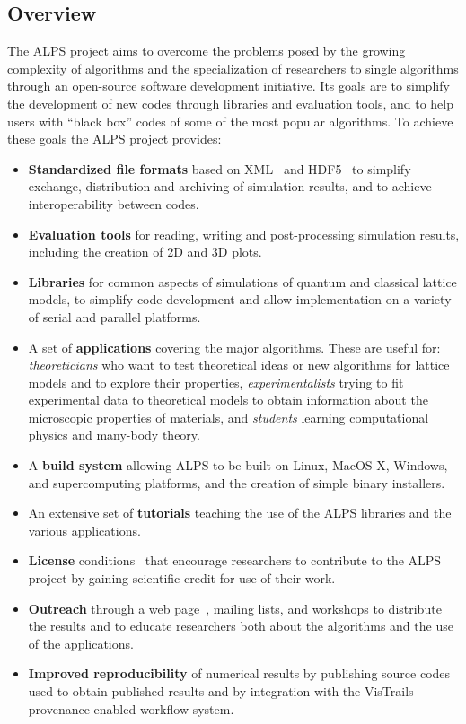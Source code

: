 \documentclass[12pt]{iopart}
\begin{document}
\subsection{Overview}
The ALPS project aims to
overcome the problems posed by the growing complexity of algorithms
and the specialization of researchers to single algorithms through
an open-source software development initiative. Its goals are to simplify the development of new codes through libraries and evaluation tools, and to help users with ``black box'' codes of some of the most popular algorithms. To achieve these goals the ALPS project provides:
\begin{itemize}
\item {\bf Standardized file formats} based on XML~\cite{xml} and HDF5~\cite{hdf5} to simplify exchange,
distribution and archiving of simulation results, and to achieve
interoperability between codes.

\item {\bf Evaluation tools} for reading, writing and post-processing simulation results, including the creation of 2D and 3D plots.

\item {\bf Libraries} for common aspects of
simulations of quantum and classical lattice models, to simplify code
development and allow implementation on a variety of serial and parallel platforms.
\item A set of {\bf applications} covering the major algorithms. These are useful for: 
{\it theoreticians} who want to test theoretical ideas or new algorithms for
lattice models and to explore their properties, 
{\it experimentalists} trying to fit experimental data to theoretical
models to obtain information about the microscopic properties of
materials, and {\it students} learning computational physics and many-body theory.
\item A {\bf build system} allowing ALPS to be built on Linux, MacOS X, Windows, and supercomputing platforms, and the creation of simple binary installers.
\item An extensive set of {\bf tutorials} teaching the use of the ALPS libraries and the various applications.

\item{\bf License} conditions~\cite{librarylicense,applicationlicense} that encourage researchers to contribute
to the ALPS project by gaining scientific credit for use of their
work.
\item {\bf Outreach} through a web page~\cite{alps}, mailing lists, and
workshops to distribute the results and to educate researchers both
about the algorithms and the use of the applications.
\item {\bf Improved reproducibility} of numerical results by
publishing source codes used to obtain published results and by integration with the VisTrails~\cite{vistrails} provenance enabled workflow system.
\end{itemize}
\end{document}
